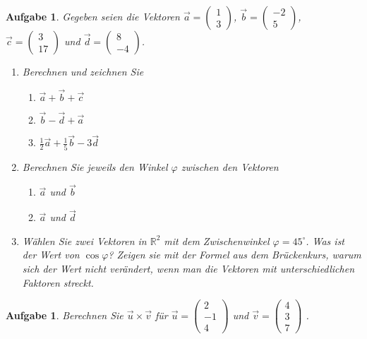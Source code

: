 \documentclass[12pt]{article}
\newtheorem{exercise}[satz]{Aufgabe}
\begin{document}
 \begin{exercise}
  Gegeben seien die Vektoren
  $\vec{a}=\left(\begin{array}{r} 1 \\ 3 \end{array}\right)$,
  $\vec{b}=\left(\begin{array}{r} -2 \\ 5 \end{array}\right)$,\\
  $\vec{c}=\left(\begin{array}{r} 3 \\ 17 \end{array}\right)$ und
  $\vec{d}=\left(\begin{array}{r} 8 \\ -4 \end{array}\right)$.
  \begin{enumerate}
  \item[(a)] Berechnen und zeichnen Sie
      \begin{enumerate}
      \item[(i)] $\vec{a}+\vec{b}+\vec{c}$
      \item[(ii)] $\vec{b}-\vec{d}+\vec{a}$
      \item[(iii)] $\frac{1}{2}\vec{a}+\frac{1}{5}\vec{b}-3\vec{d}$
      \end{enumerate}
  \item[(b)] Berechnen Sie jeweils den Winkel $\varphi$ zwischen den Vektoren
    \begin{enumerate}
      \item[(i)] $\vec{a}$ und $\vec{b}$
      \item[(ii)] $\vec{a}$ und $\vec{d}$
      \end{enumerate}
    \item[(c)] W\"ahlen Sie zwei Vektoren in $\mathbb{R}^2$ mit dem Zwischenwinkel $\varphi=45^\circ$. Was ist der Wert von $\cos{\varphi}$? Zeigen sie mit der Formel aus dem Br\"uckenkurs, warum sich der Wert nicht  ver\"andert, wenn man die Vektoren mit unterschiedlichen Faktoren streckt. 
  \end{enumerate}
   \end{exercise}

\vspace{0.1cm}   


\begin{exercise}
  Berechnen Sie $\vec{u}\times \vec{v}$ f\"ur
  $\vec{u}=\left(\begin{array}{r} 2 \\ -1 \\ 4 \end{array}\right)$ und
  $\vec{v}=\left(\begin{array}{r} 4 \\ 3 \\ 7 \end{array}\right)$ .
\end{exercise}
\end{document}
